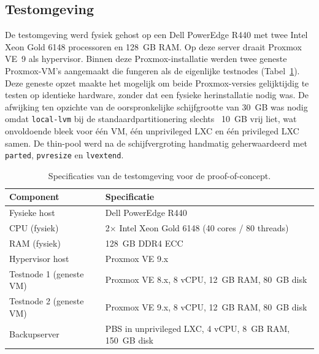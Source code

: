 \subsection{Testomgeving}
De testomgeving werd fysiek gehost op een Dell PowerEdge R440 met twee Intel\textregistered{} Xeon\textregistered{} Gold 6148 processoren en 128~GB RAM. Op deze server draait Proxmox VE~9 als hypervisor. Binnen deze Proxmox-installatie werden twee geneste Proxmox-VM's aangemaakt die fungeren als de eigenlijke testnodes (Tabel~\ref{tab:testomgeving}). Deze geneste opzet maakte het mogelijk om beide Proxmox-versies gelijktijdig te testen op identieke hardware, zonder dat een fysieke herinstallatie nodig was. De afwijking ten opzichte van de oorspronkelijke schijfgrootte van 30~GB  was nodig omdat \texttt{local-lvm} bij de standaardpartitionering slechts ~10~GB vrij liet, wat onvoldoende bleek voor één VM, één unprivileged LXC en één privileged LXC samen. De thin-pool werd na de schijfvergroting handmatig geherwaardeerd met \texttt{parted}, \texttt{pvresize} en \texttt{lvextend}.

\begin{table}[h]
    \centering
    \caption[Specificaties testomgeving]{Specificaties van de testomgeving voor de proof-of-concept.}
    \label{tab:testomgeving}
    \begin{tabular}{ll}
        \toprule
        \textbf{Component} & \textbf{Specificatie} \\
        \midrule
        Fysieke host          & Dell PowerEdge R440 \\
        CPU (fysiek)          & 2$\times$ Intel Xeon Gold 6148 (40 cores / 80 threads) \\
        RAM (fysiek)          & 128~GB DDR4 ECC \\
        Hypervisor host       & Proxmox VE 9.x \\
        Testnode 1 (geneste VM) & Proxmox VE 8.x, 8 vCPU, 12~GB RAM, 80~GB disk \\
        Testnode 2 (geneste VM) & Proxmox VE 9.x, 8 vCPU, 12~GB RAM, 80~GB disk \\
        Backupserver          & PBS in unprivileged LXC, 4 vCPU, 8~GB RAM, 150~GB disk \\
        \bottomrule
    \end{tabular}
\end{table}

